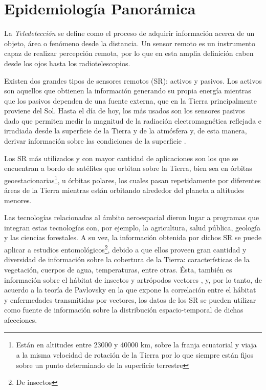 



\section{Epidemiología Panorámica}

\justifying


\par La \textit{Teledetección} se define como el proceso de adquirir
  información acerca de un objeto, área o fenómeno desde la distancia.
  Un sensor remoto es un instrumento capaz de realizar percepción remota, por lo
  que en esta amplia definición caben desde los ojos hasta los
  radiotelescopios.

\par Existen dos grandes tipos de sensores remotos (SR): activos y pasivos.
  Los activos son aquellos que obtienen la información generando su propia energía
  mientras que los pasivos dependen de una fuente externa, que en la Tierra
  principalmente proviene del Sol. Hasta el día de hoy, los más usados son los
  sensores pasivos dado que permiten medir la magnitud de la radiación electromagnética
  reflejada e irradiada desde la superficie de la Tierra y de la atmósfera y,
  de esta manera, derivar información sobre las condiciones de la superficie \cite{cami_tartagal}.


\par Los SR más utilizados y con mayor cantidad de aplicaciones son los que se
  encuentran a bordo de satélites que orbitan sobre la Tierra, bien sea
  en órbitas geoestacionarias\footnote{Están en altitudes entre 23000 y 40000 km,
  sobre la franja ecuatorial y viaja a la misma velocidad de rotación de la Tierra
  por lo que siempre están fijos sobre un punto determinado de la superficie terrestre},
  u órbitas polares, los cuales pasan repetidamente por diferentes áreas
  de la Tierra mientras están orbitando alrededor del planeta a altitudes menores.


\par Las tecnologías relacionadas al ámbito aeroespacial dieron lugar a programas
  que integran estas tecnologías con,
  por ejemplo, la agricultura, salud pública, geología y las ciencias forestales.
  A su vez, la información obtenida por dichos SR se puede aplicar a estudios
  entomológicos\footnote{De insectos}, debido a que ellos proveen gran cantidad
  y diversidad de información sobre la cobertura de la Tierra: características
  de la vegetación, cuerpos de agua, temperaturas, entre otras. Ésta, también es
  información sobre el hábitat de insectos y artrópodos vectores \cite{ndwi_erffectiveness, data_driven_prediction},
  y, por lo tanto, de acuerdo a la teoría de Pavlovsky \cite{nidality} en la que
  expone la correlación entre el hábitat y enfermedades transmitidas por vectores,
  los datos de los SR se pueden utilizar como fuente de información sobre la
  distribución espacio-temporal de dichas afecciones.


